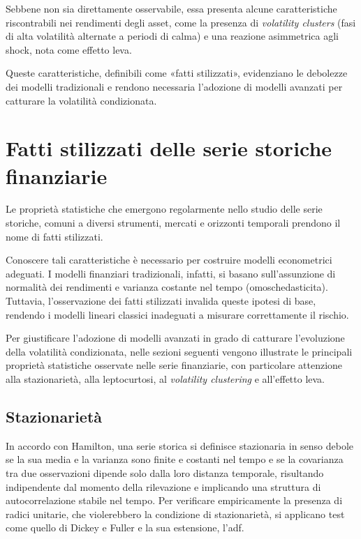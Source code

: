 Sebbene non sia direttamente osservabile, essa presenta alcune caratteristiche riscontrabili nei rendimenti degli asset, come la presenza di \emph{volatility clusters} (fasi di alta volatilità alternate a periodi di calma) e una reazione asimmetrica agli shock, nota come effetto leva.

Queste caratteristiche, definibili come «fatti stilizzati», evidenziano le debolezze dei modelli tradizionali e rendono necessaria l'adozione di modelli avanzati per catturare la volatilità condizionata.


\section[Fatti stilizzati]{Fatti stilizzati delle serie storiche finanziarie}
Le proprietà statistiche che emergono regolarmente nello studio delle serie storiche, comuni a diversi strumenti, mercati e orizzonti temporali 
prendono il nome di fatti stilizzati\cite{cont:empirical}.

Conoscere tali caratteristiche è necessario per costruire modelli econometrici adeguati. I modelli finanziari tradizionali, infatti, 
si basano sull'assunzione di normalità dei rendimenti e varianza costante nel tempo (\gls{omoschedasticita}). Tuttavia, l'osservazione dei fatti 
stilizzati invalida queste ipotesi di base, rendendo i modelli lineari classici inadeguati a misurare correttamente il rischio.

Per giustificare l'adozione di modelli avanzati in grado di catturare l'evoluzione della volatilità condizionata, nelle sezioni seguenti 
vengono illustrate le principali proprietà statistiche osservate nelle serie finanziarie, con particolare attenzione alla stazionarietà, 
alla leptocurtosi, al \emph{volatility clustering} e all'effetto leva.


\subsection{Stazionarietà}
In accordo con Hamilton\cite{hamilton:timeseries}, una serie storica si definisce stazionaria in senso debole se la sua media e la 
varianza sono finite e costanti nel tempo e se la covarianza tra due osservazioni dipende solo dalla loro distanza temporale, risultando indipendente dal 
momento della rilevazione e implicando una struttura di autocorrelazione stabile nel tempo. Per verificare empiricamente la presenza di radici unitarie, 
che violerebbero la condizione di stazionarietà, si applicano test come quello di Dickey e Fuller\cite{dickey:estimators} e la sua estensione, l'\gls{adf}.

